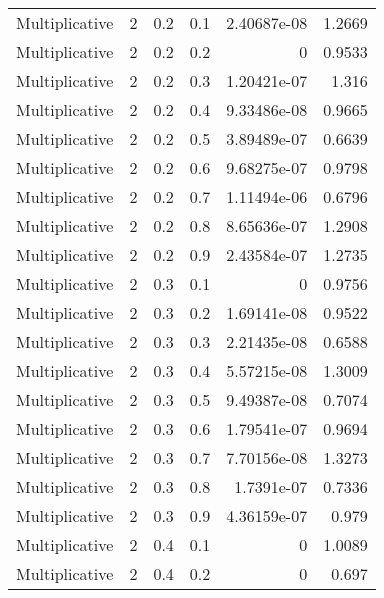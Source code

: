 \documentclass{article}
\begin{document}
\begin{longtable}[H]{lrrrrr}
 Multiplicative &       2 &   0.2 &            0.1 &      2.40687e-08 &          1.2669 \\
 Multiplicative &       2 &   0.2 &            0.2 &      0           &          0.9533 \\
 Multiplicative &       2 &   0.2 &            0.3 &      1.20421e-07 &          1.316  \\
 Multiplicative &       2 &   0.2 &            0.4 &      9.33486e-08 &          0.9665 \\
 Multiplicative &       2 &   0.2 &            0.5 &      3.89489e-07 &          0.6639 \\
 Multiplicative &       2 &   0.2 &            0.6 &      9.68275e-07 &          0.9798 \\
 Multiplicative &       2 &   0.2 &            0.7 &      1.11494e-06 &          0.6796 \\
 Multiplicative &       2 &   0.2 &            0.8 &      8.65636e-07 &          1.2908 \\
 Multiplicative &       2 &   0.2 &            0.9 &      2.43584e-07 &          1.2735 \\
 Multiplicative &       2 &   0.3 &            0.1 &      0           &          0.9756 \\
 Multiplicative &       2 &   0.3 &            0.2 &      1.69141e-08 &          0.9522 \\
 Multiplicative &       2 &   0.3 &            0.3 &      2.21435e-08 &          0.6588 \\
 Multiplicative &       2 &   0.3 &            0.4 &      5.57215e-08 &          1.3009 \\
 Multiplicative &       2 &   0.3 &            0.5 &      9.49387e-08 &          0.7074 \\
 Multiplicative &       2 &   0.3 &            0.6 &      1.79541e-07 &          0.9694 \\
 Multiplicative &       2 &   0.3 &            0.7 &      7.70156e-08 &          1.3273 \\
 Multiplicative &       2 &   0.3 &            0.8 &      1.7391e-07  &          0.7336 \\
 Multiplicative &       2 &   0.3 &            0.9 &      4.36159e-07 &          0.979  \\
 Multiplicative &       2 &   0.4 &            0.1 &      0           &          1.0089 \\
 Multiplicative &       2 &   0.4 &            0.2 &      0           &          0.697  \\

\end{longtable}
\end{document}
